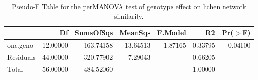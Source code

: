 \begin{table}[ht]
\centering
\begin{tabular}{lrrrrrr}
  \hline
 & Df & SumsOfSqs & MeanSqs & F.Model & R2 & Pr($>$F) \\ 
  \hline
onc.geno & 12.00000 & 163.74158 & 13.64513 & 1.87165 & 0.33795 & 0.04100 \\ 
  Residuals & 44.00000 & 320.77902 & 7.29043 &  & 0.66205 &  \\ 
  Total & 56.00000 & 484.52060 &  &  & 1.00000 &  \\ 
   \hline
\end{tabular}
\caption{Pseudo-F Table for the perMANOVA test of genotype effect on lichen network similarity.} 
\label{tab:cn_perm}
\end{table}
